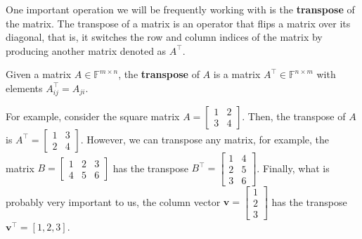 \documentclass[../lecture-notes.tex]{subfiles}
\begin{document}
One important operation we will be frequently working with is the \textbf{transpose} of the matrix. The transpose of a matrix is an operator that flips a matrix over its diagonal, that is, it switches the row and column indices of the matrix by producing another matrix denoted as $A^{\top}$.

\begin{definition}[Transposition]
    Given a matrix $A \in \mathbb{F}^{m \times n}$, the \textbf{transpose} of $A$ is a matrix $A^{\top} \in \mathbb{F}^{n \times m}$ with elements $A^{\top}_{ij} = A_{ji}$.
\end{definition}

\begin{example}
    For example, consider the square matrix $A = \begin{bmatrix} 1 & 2 \\ 3 & 4 \end{bmatrix}$. Then, the transpose of $A$ is $A^{\top} = \begin{bmatrix} 1 & 3 \\ 2 & 4 \end{bmatrix}$. However, we can transpose any matrix, for example, the matrix $B = \begin{bmatrix} 1 & 2 & 3 \\ 4 & 5 & 6 \end{bmatrix}$ has the transpose $B^{\top} = \begin{bmatrix} 1 & 4 \\ 2 & 5 \\ 3 & 6 \end{bmatrix}$. Finally, what is probably very important to us, the column vector $\mathbf{v} = \begin{bmatrix} 1 \\ 2 \\ 3 \end{bmatrix}$ has the transpose $\mathbf{v}^{\top} = [1,2,3]$.
\end{example}
\end{document}

